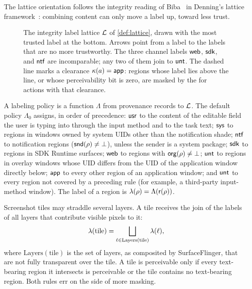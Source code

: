 The lattice orientation follows the integrity reading of Biba~\cite{biba1977integrity} in Denning's lattice framework~\cite{denning1976lattice}: combining content can only move a label up, toward less trust.

\begin{figure}[t]
  \centering
  
  \caption{The integrity label lattice $\mathcal{L}$ of \cref{def:lattice}, drawn with the most trusted label at the bottom. Arrows point from a label to the labels that are no more trustworthy. The three channel labels $\textsf{web}$, $\textsf{sdk}$, and $\textsf{ntf}$ are incomparable; any two of them join to $\textsf{unt}$. The dashed line marks a clearance $\kappa(a)=\textsf{app}$: regions whose label lies above the line, or whose perceivability bit is zero, are masked by the \CG{} for actions with that clearance.}
  \label{fig:lattice}
\end{figure}

\begin{definition}\label{def:labeling}
A labeling policy is a function $\Lambda$ from provenance records to $\mathcal{L}$. The default policy $\Lambda_0$ assigns, in order of precedence: $\textsf{usr}$ to the content of the editable field the user is typing into through the input method and to the task text; $\textsf{sys}$ to regions in windows owned by system UIDs other than the notification shade; $\textsf{ntf}$ to notification regions ($\mathsf{snd}(\rho)\neq\bot$), unless the sender is a system package; $\textsf{sdk}$ to regions in SDK Runtime surfaces; $\textsf{web}$ to regions with $\mathsf{org}(\rho)\neq\bot$; $\textsf{unt}$ to regions in overlay windows whose UID differs from the UID of the application window directly below; $\textsf{app}$ to every other region of an application window; and $\textsf{unt}$ to every region not covered by a preceding rule (for example, a third-party input-method window). The label of a region is $\lambda(\rho)=\Lambda(\mathsf{r}(\rho))$.
\end{definition}

Screenshot tiles may straddle several layers. A tile receives the join of the labels of all layers that contribute visible pixels to it:
\begin{equation}\label{eq:tilejoin}
  \lambda(\text{tile}) = \bigsqcup_{\ell\in\mathrm{Layers}(\text{tile})} \lambda(\ell),
\end{equation}
where $\mathrm{Layers}(\text{tile})$ is the set of layers, as composited by SurfaceFlinger, that are not fully transparent over the tile. A tile is perceivable only if every text-bearing region it intersects is perceivable or the tile contains no text-bearing region. Both rules err on the side of more masking.

